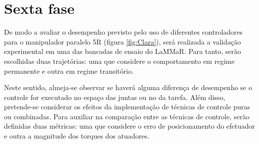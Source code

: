 \documentclass[]{politex}
\begin{document}
\section{Sexta fase} 
De modo a avaliar o desempenho previsto pelo uso de diferentes controladores para o manipulador paralelo 5R (figura \ref{fig:Clara}), será realizada a validação experimental em uma das bancadas de ensaio do LaMMaR. Para tanto, serão escolhidas duas trajetórias: uma que considere o comportamento em regime permanente e outra em regime transitório. 

Neste sentido, almeja-se observar se haverá alguma diferença de desempenho se o controle for executado no espaço das juntas ou no da tarefa. Além disso, pretende-se considerar os efeitos da implementação de técnicas de controle puras ou combinadas.
Para auxiliar na comparação entre as técnicas de controle, serão definidas duas métricas: uma que considere o erro de posicionamento do efetuador e outra a magnitude dos torques dos atuadores.



\end{document}
